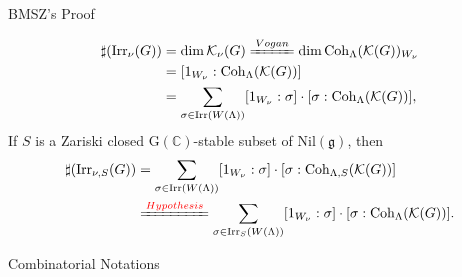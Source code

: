 \documentclass{beamer}
\newcommand{\BC}{{\mathbb {C}}}
\newcommand{\CK}{{\mathcal {K}}}
\newcommand{\RG}{{\mathrm {G}}}
\newcommand{\fg}{\mathfrak{g}}
\newcommand{\Irr}{{\mathrm{Irr}}}
\newcommand{\Nil}{{\mathrm{Nil}}}
\begin{document}
\begin{frame}{BMSZ's Proof}
  
  \begin{align*}
    \sharp(\Irr_{\nu}(G)) &= \dim \CK_{\nu}(G) \xlongequal{Vogan} \dim \mathrm{Coh}_{\Lambda}(\CK(G))_{W_\nu} \\
    & = [1_{W_{\nu}}:\mathrm{Coh}_{\Lambda}(\CK(G))] \\
    & = \sum_{\sigma \in \Irr(W(\Lambda))} [1_{W_\nu}:\sigma] \cdot [\sigma:\mathrm{Coh}_{\Lambda}(\CK(G))],
  \end{align*}
  If $S$ is a Zariski closed $\RG(\BC)$-stable subset of $\Nil(\fg)$, then
  \begin{align*}
    \sharp(\Irr_{\nu,S}(G)) & = \sum_{\sigma \in \Irr(W(\Lambda))} [1_{W_\nu}:\sigma] \cdot [\sigma:\mathrm{Coh}_{\Lambda,S}(\CK(G))]\\
    & \xlongequal{\textcolor{red}{Hypothesis}} \sum_{\sigma \in \Irr_{S}(W(\Lambda))} [1_{W_\nu}:\sigma] \cdot [\sigma:\mathrm{Coh}_{\Lambda}(\CK(G))].
  \end{align*}
\end{frame}











\begin{frame}{Combinatorial Notations}

\end{frame}
\end{document}

